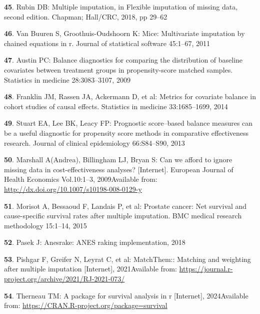 \documentclass[
  letterpaper,
  DIV=11,
  numbers=noendperiod]{scrartcl}
\newlength{\cslhangindent}
\newenvironment{CSLReferences}[2] %
 {\begin{list}{}{%
  \setlength{\itemindent}{0pt}
  \setlength{\leftmargin}{0pt}
  \setlength{\parsep}{0pt}
  \ifodd #1
   \setlength{\leftmargin}{\cslhangindent}
   \setlength{\itemindent}{-1\cslhangindent}
  \fi
  \setlength{\itemsep}{#2\baselineskip}}}
 {\end{list}}
\begin{document}
\begin{CSLReferences}{0}{1}
\textbf{45}. Rubin DB: Multiple imputation, in Flexible imputation of
missing data, second edition. Chapman; Hall/CRC, 2018, pp 29--62

\textbf{46}. Van Buuren S, Groothuis-Oudshoorn K: Mice: Multivariate
imputation by chained equations in r. Journal of statistical software
45:1--67, 2011

\textbf{47}. Austin PC: Balance diagnostics for comparing the
distribution of baseline covariates between treatment groups in
propensity-score matched samples. Statistics in medicine 28:3083--3107,
2009

\textbf{48}. Franklin JM, Rassen JA, Ackermann D, et al: Metrics for
covariate balance in cohort studies of causal effects. Statistics in
medicine 33:1685--1699, 2014

\textbf{49}. Stuart EA, Lee BK, Leacy FP: Prognostic score--based
balance measures can be a useful diagnostic for propensity score methods
in comparative effectiveness research. Journal of clinical epidemiology
66:S84--S90, 2013

\textbf{50}. Marshall A(Andrea), Billingham LJ, Bryan S: Can we afford
to ignore missing data in cost-effectiveness analyses? {[}Internet{]}.
European Journal of Health Economics Vol.10:1--3, 2009Available from:
\url{http://dx.doi.org/10.1007/s10198-008-0129-y}

\textbf{51}. Morisot A, Bessaoud F, Landais P, et al: Prostate cancer:
Net survival and cause-specific survival rates after multiple
imputation. BMC medical research methodology 15:1--14, 2015

\textbf{52}. Pasek J: Anesrake: ANES raking implementation, 2018

\textbf{53}. Pishgar F, Greifer N, Leyrat C, et al: MatchThem:: Matching
and weighting after multiple imputation {[}Internet{]}, 2021Available
from: \url{https://journal.r-project.org/archive/2021/RJ-2021-073/}

\textbf{54}. Therneau TM: A package for survival analysis in r
{[}Internet{]}, 2024Available from:
\url{https://CRAN.R-project.org/package=survival}


\end{CSLReferences}
\end{document}
